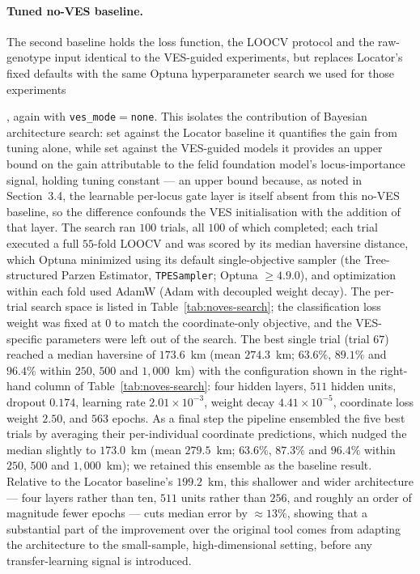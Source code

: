 \documentclass[twocolumn,10pt]{article}
\newcommand{\TODO}[1]{%
  \par\medskip\noindent
  \fcolorbox{red}{yellow!15}{%
    \parbox{0.95\linewidth}{\footnotesize\textbf{\textcolor{red}{[[TODO]]}}\ #1}}%
  \par\medskip}
\begin{document}
\paragraph{Tuned no-VES baseline.} The second baseline holds the loss function, the LOOCV protocol
and the raw-genotype input identical to the VES-guided experiments, but replaces Locator's fixed
defaults with the same Optuna hyperparameter search we used for those experiments \TODO{same Optuna
citation as above}, again with \texttt{ves\_mode}${}=$\texttt{none}. This isolates the
contribution of Bayesian architecture search: set against the Locator baseline it quantifies the
gain from tuning alone, while set against the VES-guided models it provides an upper bound on the
gain attributable to the felid foundation model's locus-importance signal, holding tuning constant
--- an upper bound because, as noted in Section~3.4, the learnable per-locus gate layer is itself
absent from this no-VES baseline, so the difference confounds the VES initialisation with the
addition of that layer. The search ran $100$ trials, all $100$ of which completed; each trial
executed a full $55$-fold LOOCV and was scored by its median haversine distance, which Optuna
minimized using its default single-objective sampler (the Tree-structured Parzen Estimator,
\texttt{TPESampler}; Optuna $\geq 4.9.0$), and optimization within each fold used AdamW (Adam with
decoupled weight decay). The per-trial search space is listed in Table~\ref{tab:noves-search}; the
classification loss weight was fixed at $0$ to match the coordinate-only objective, and the
VES-specific parameters were left out of the search. The best single trial (trial $67$) reached a
median haversine of $173.6$~km (mean $274.3$~km; $63.6\%$, $89.1\%$ and $96.4\%$ within $250$, $500$
and $1{,}000$~km) with the configuration shown in the right-hand column of
Table~\ref{tab:noves-search}: four hidden layers, $511$ hidden units, dropout $0.174$, learning rate
$2.01\times10^{-3}$, weight decay $4.41\times10^{-5}$, coordinate loss weight $2.50$, and $563$
epochs. As a final step the pipeline ensembled the five best trials by averaging their
per-individual coordinate predictions, which nudged the median slightly to $173.0$~km (mean
$279.5$~km; $63.6\%$, $87.3\%$ and $96.4\%$ within $250$, $500$ and $1{,}000$~km); we retained this
ensemble as the baseline result. Relative to the Locator baseline's $199.2$~km, this shallower and
wider architecture --- four layers rather than ten, $511$ units rather than $256$, and roughly an
order of magnitude fewer epochs --- cuts median error by $\approx13\%$, showing that a substantial
part of the improvement over the original tool comes from adapting the architecture to the
small-sample, high-dimensional setting, before any transfer-learning signal is introduced.
\end{document}
